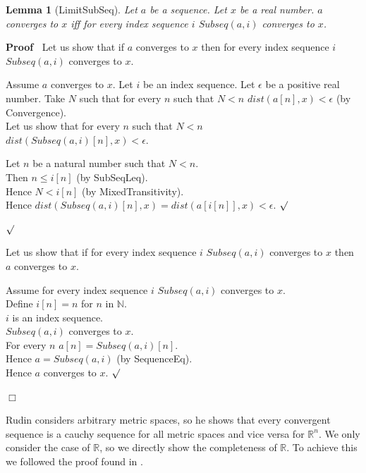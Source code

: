 \documentclass{article}
\newenvironment{forthel}{\begin{leftbar}}{\end{leftbar}}
\newenvironment{proof}{\noindent\textbf{Proof\ }}{\hspace*{\fill}$\Box$\medskip}
\newenvironment{subproof}{\begin{list}{}{}
		\item[\text{Proof}]}{\hfill $\surd$ \end{list}}
\newtheorem{lemma}{Lemma}
\newcommand{\RR}{\mathbb{R}}
\newcommand{\NN}{\mathbb{N}}
\begin{document}
\begin{forthel}
	\begin{lemma}[LimitSubSeq]
		Let $a$ be a sequence. Let $x$ be a real number. \linebreak $a$ converges to $x$ iff for every index sequence $i$ $Subseq(a,i)$ converges to $x$. 
	\end{lemma}
	\begin{proof}
		Let us show that if $a$ converges to $x$ then for every index sequence $i$ $Subseq(a,i)$ converges to $x$.
		
		\begin{subproof}
			Assume $a$ converges to $x$. 
			Let $i$ be an index sequence.
			Let $\epsilon$ be a positive real number.
			Take $N$ such that for every $n$ such that $N < n$ $dist(a[n],x) < \epsilon$ (by Convergence).
			\\Let us show that for every $n$ such that $N < n$ \\ $dist(Subseq(a,i)[n],x) < \epsilon$.
			\begin{subproof}
				Let $n$ be a natural number such that $N < n$.\\
				Then $n \leq i[n]$ (by SubSeqLeq).\\
				Hence $N < i[n]$ (by MixedTransitivity).\\
				Hence $dist(Subseq(a,i)[n],x) = dist(a[i[n]],x) < \epsilon$.
			\end{subproof}
		\end{subproof}
		Let us show that if for every index sequence $i$ $Subseq(a,i)$ converges to $x$ then $a$ converges to $x$.
		\begin{subproof}
			Assume for every index sequence $i$ $Subseq(a,i)$ converges to $x$. \\
			Define $i[n] = n$ for $n$ in $\NN$.\\
			$i$ is an index sequence.\\
			$Subseq(a,i)$ converges to $x$. \\
			For every $n$ $a[n] = Subseq(a,i)[n]$. \\
			Hence $a = Subseq(a,i)$ (by SequenceEq). \\
			Hence $a$ converges to $x$.
		\end{subproof}
	\end{proof}
\end{forthel}

\noindent Rudin considers arbitrary metric spaces, so he shows that every convergent sequence is a cauchy sequence for all metric spaces and vice versa for $\RR^{n}$. We only consider the case of $\RR$, so we directly show the completeness of $\RR$. To achieve this we followed the proof found in \cite{Cauchy}.
\end{document}
